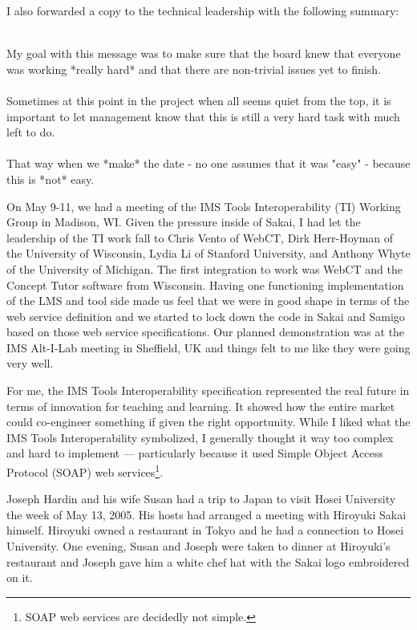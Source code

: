 \documentclass[12pt]{book}
\begin{document}
I also forwarded a copy to the technical leadership
with the following summary:\\
\\
\begin{sf}
My goal with this message was to make sure that the
board knew that everyone was working *really hard*
and that there are non-trivial issues yet to finish.\\
\\
Sometimes at this point in the project when all
seems quiet from the top, it is important to let
management know that this is still a very hard task
with much left to do.\\
\\
That way when we *make* the date - no one assumes that
it was "easy" - because this is *not* easy.\\
\end{sf}

On May 9-11, we had a meeting of the IMS Tools Interoperability (TI)
Working Group in Madison, WI.  Given the pressure inside
of Sakai, I had let the leadership of the TI work
fall to Chris Vento of WebCT, Dirk Herr-Hoyman of the University of Wisconsin,
Lydia Li of Stanford University, and Anthony Whyte of the University
of Michigan.
The first integration to work was WebCT and the
Concept Tutor software from Wisconsin.   Having one
functioning implementation of the LMS and tool side made us
feel that we were in good shape in terms of the web service
definition and we started to lock down the code in Sakai
and Samigo based on those web service specifications.
Our planned demonstration was at the IMS Alt-I-Lab meeting
in Sheffield, UK and things felt to me like they
were going very well.


For me, the IMS Tools Interoperability specification
represented the real future in terms of innovation
for teaching and learning.  It showed how the entire market
could co-engineer something if given the right opportunity.
While I liked what the IMS Tools Interoperability symbolized,
I generally thought it way too complex and hard to
implement --- particularly because it used 
Simple Object Access Protocol
(SOAP) web services\footnote{SOAP web services are decidedly 
not simple.}.

Joseph Hardin and his wife Susan had a trip to Japan to visit
Hosei University the week of May 13, 2005.  His hosts had
arranged a meeting with Hiroyuki Sakai himself.  Hiroyuki
owned a restaurant in Tokyo and he had a connection to Hosei
University.   One evening, Susan and Joseph were taken to dinner
at Hiroyuki's restaurant and Joseph gave him a white chef hat
with the Sakai logo embroidered on it.
\end{document}
